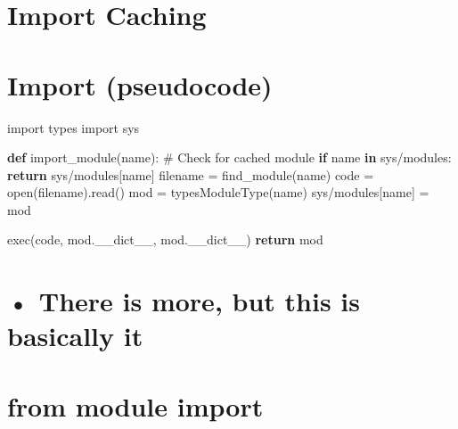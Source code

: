 \documentclass[
  letterpaper,
  DIV=11,
  numbers=noendperiod]{scrreprt}
\newenvironment{Shaded}{\begin{snugshade}}{\end{snugshade}}
\newcommand{\BuiltInTok}[1]{\textcolor[rgb]{0.00,0.23,0.31}{#1}}
\newcommand{\CommentTok}[1]{\textcolor[rgb]{0.37,0.37,0.37}{#1}}
\newcommand{\ControlFlowTok}[1]{\textcolor[rgb]{0.00,0.23,0.31}{\textbf{#1}}}
\newcommand{\KeywordTok}[1]{\textcolor[rgb]{0.00,0.23,0.31}{\textbf{#1}}}
\newcommand{\NormalTok}[1]{\textcolor[rgb]{0.00,0.23,0.31}{#1}}
\newcommand{\OperatorTok}[1]{\textcolor[rgb]{0.37,0.37,0.37}{#1}}
\begin{document}

\chapter{Import Caching}\label{import-caching}


\chapter{Import (pseudocode)}\label{import-pseudocode}

import types import sys

\begin{Shaded}
\begin{Highlighting}[]
\KeywordTok{def}\NormalTok{ import\_module(name):}
    \CommentTok{\# Check for cached module}
    \ControlFlowTok{if}\NormalTok{ name }\KeywordTok{in}\NormalTok{ sys}\OperatorTok{/}\NormalTok{modules:}
        \ControlFlowTok{return}\NormalTok{ sys}\OperatorTok{/}\NormalTok{modules[name]}
\NormalTok{    filename }\OperatorTok{=}\NormalTok{ find\_module(name)}
\NormalTok{    code }\OperatorTok{=} \BuiltInTok{open}\NormalTok{(filename).read()}
\NormalTok{    mod }\OperatorTok{=}\NormalTok{ typesModuleType(name)}
\NormalTok{    sys}\OperatorTok{/}\NormalTok{modules[name] }\OperatorTok{=}\NormalTok{ mod }
\end{Highlighting}
\end{Shaded}

\begin{Shaded}
\begin{Highlighting}[]
\BuiltInTok{exec}\NormalTok{(code, mod.\_\_dict\_\_, mod.\_\_dict\_\_) }\ControlFlowTok{return}\NormalTok{ mod }
\end{Highlighting}
\end{Shaded}


\chapter{• There is more, but this is basically
it}\label{there-is-more-but-this-is-basically-it}


\chapter{from module import}\label{from-module-import-3}
\end{document}
